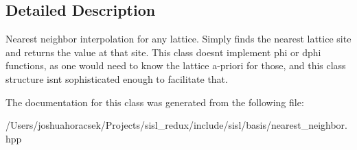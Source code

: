 \subsection{Detailed Description}
Nearest neighbor interpolation for any lattice. Simply finds the nearest lattice site and returns the value at that site. This class doesn\textquotesingle{}t implement phi or dphi functions, as one would need to know the lattice a-\/priori for those, and this class structure isn\textquotesingle{}t sophisticated enough to facilitate that. 

The documentation for this class was generated from the following file\+:\begin{DoxyCompactItemize}
\item 
/\+Users/joshuahoracsek/\+Projects/sisl\+\_\+redux/include/sisl/basis/nearest\+\_\+neighbor.\+hpp\end{DoxyCompactItemize}
